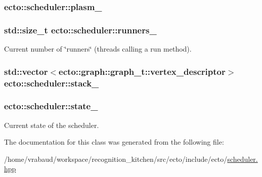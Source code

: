 \subsubsection[{\texorpdfstring{plasm\+\_\+}{plasm_}}]{ ecto\+::scheduler\+::plasm\+\_\+\hspace{0.3cm}{\ttfamily [private]}}\hypertarget{classecto_1_1scheduler_a9ccfb508a5bf75ec7ca69b475a7c7226}{}\label{classecto_1_1scheduler_a9ccfb508a5bf75ec7ca69b475a7c7226}
\subsubsection[{\texorpdfstring{runners\+\_\+}{runners_}}]{\setlength{\rightskip}{0pt plus 5cm}std\+::size\+\_\+t ecto\+::scheduler\+::runners\+\_\+\hspace{0.3cm}{\ttfamily [private]}}\hypertarget{classecto_1_1scheduler_a650d97445fe90ba4572d208430f71e20}{}\label{classecto_1_1scheduler_a650d97445fe90ba4572d208430f71e20}


Current number of \char`\"{}runners\char`\"{} (threads calling a run method). 

\subsubsection[{\texorpdfstring{stack\+\_\+}{stack_}}]{\setlength{\rightskip}{0pt plus 5cm}std\+::vector$<$ecto\+::graph\+::graph\+\_\+t\+::vertex\+\_\+descriptor$>$ ecto\+::scheduler\+::stack\+\_\+\hspace{0.3cm}{\ttfamily [private]}}\hypertarget{classecto_1_1scheduler_ad2b6561ebc08afd8cf8edaa39cb702b8}{}\label{classecto_1_1scheduler_ad2b6561ebc08afd8cf8edaa39cb702b8}
\subsubsection[{\texorpdfstring{state\+\_\+}{state_}}]{ ecto\+::scheduler\+::state\+\_\+\hspace{0.3cm}{\ttfamily [private]}}\hypertarget{classecto_1_1scheduler_a21d2aac4a8a2ef665942b7c9b741250c}{}\label{classecto_1_1scheduler_a21d2aac4a8a2ef665942b7c9b741250c}


Current state of the scheduler. 



The documentation for this class was generated from the following file\+:\begin{DoxyCompactItemize}
\item 
/home/vrabaud/workspace/recognition\+\_\+kitchen/src/ecto/include/ecto/\hyperlink{scheduler_8hpp}{scheduler.\+hpp}\end{DoxyCompactItemize}
